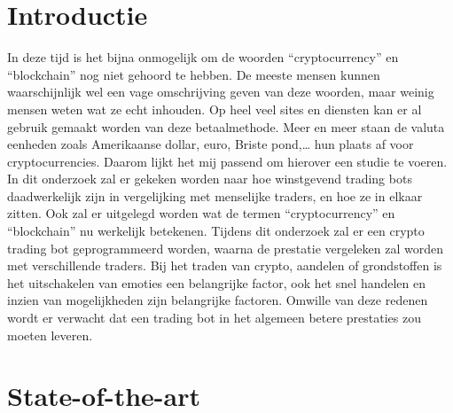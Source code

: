 
\section{Introductie} %
\label{sec:introductie}

In deze tijd is het bijna onmogelijk om de woorden “cryptocurrency” en “blockchain” nog niet gehoord te hebben. De meeste mensen kunnen waarschijnlijk wel een vage omschrijving geven van deze woorden, maar weinig mensen weten wat ze echt inhouden. Op heel veel sites en diensten kan er al gebruik gemaakt worden van deze betaalmethode. Meer en meer staan de valuta eenheden zoals Amerikaanse dollar, euro, Briste pond,… hun plaats af voor cryptocurrencies. Daarom lijkt het mij passend om hierover een studie te voeren. In dit onderzoek zal er gekeken worden naar hoe winstgevend trading bots daadwerkelijk zijn in vergelijking met menselijke traders, en hoe ze in elkaar zitten. Ook zal er uitgelegd worden wat de termen “cryptocurrency” en “blockchain” nu werkelijk betekenen. Tijdens dit onderzoek zal er een crypto trading bot geprogrammeerd worden, waarna de prestatie vergeleken zal worden met verschillende traders. Bij het traden van crypto, aandelen of grondstoffen is het uitschakelen van emoties een belangrijke factor, ook het snel handelen en inzien van mogelijkheden zijn belangrijke factoren. Omwille van deze redenen wordt er verwacht dat een trading bot in het algemeen betere prestaties zou moeten leveren.



\section{State-of-the-art}
\label{sec:state-of-the-art}

